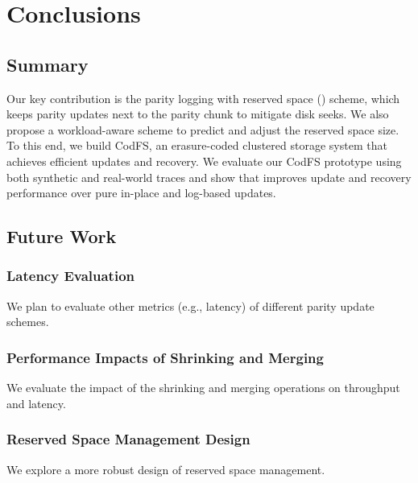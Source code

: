 \chapter{Conclusions}
\label{chap:conclusions}

\section{Summary}

Our key contribution is the parity logging with reserved space (\PLR) scheme,
which keeps parity updates next to the parity chunk to mitigate disk seeks. We
also propose a workload-aware scheme to predict and adjust the reserved space
size.  To this end, we build CodFS, an erasure-coded clustered storage system
that achieves efficient updates and recovery.  We evaluate our CodFS prototype
using both synthetic and real-world traces and show that \PLR improves update
and recovery performance over pure in-place and log-based updates.  

\section{Future Work}

\subsection{Latency Evaluation}

We plan to evaluate other metrics (e.g., latency) of different parity
update schemes. 

\subsection{Performance Impacts of Shrinking and Merging}

We evaluate the impact of the shrinking and merging
operations on throughput and latency. 

\subsection{Reserved Space Management Design}

We explore a more robust design of
reserved space management.
